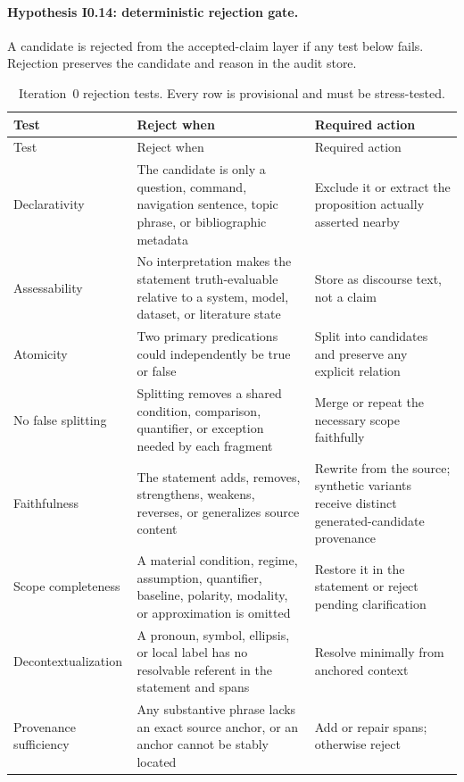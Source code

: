 \paragraph{Hypothesis I0.14: deterministic rejection gate.}
A candidate is rejected from the accepted-claim layer if any test below fails. Rejection preserves the candidate and reason in the audit store.

\small
\begin{longtable}{>{\raggedright\arraybackslash}p{}>{\raggedright\arraybackslash}p{}>{\raggedright\arraybackslash}p{}}
\caption{Iteration~0 rejection tests. Every row is provisional and must be stress-tested.}\label{tab:i0-rejection-tests}\\
\toprule
Test & Reject when & Required action \\
\midrule
\endfirsthead
\toprule
Test & Reject when & Required action \\
\midrule
\endhead
Declarativity & The candidate is only a question, command, navigation sentence, topic phrase, or bibliographic metadata & Exclude it or extract the proposition actually asserted nearby \\
Assessability & No interpretation makes the statement truth-evaluable relative to a system, model, dataset, or literature state & Store as discourse text, not a claim \\
Atomicity & Two primary predications could independently be true or false & Split into candidates and preserve any explicit relation \\
No false splitting & Splitting removes a shared condition, comparison, quantifier, or exception needed by each fragment & Merge or repeat the necessary scope faithfully \\
Faithfulness & The statement adds, removes, strengthens, weakens, reverses, or generalizes source content & Rewrite from the source; synthetic variants receive distinct generated-candidate provenance \\
Scope completeness & A material condition, regime, assumption, quantifier, baseline, polarity, modality, or approximation is omitted & Restore it in the statement or reject pending clarification \\
Decontextualization & A pronoun, symbol, ellipsis, or local label has no resolvable referent in the statement and spans & Resolve minimally from anchored context \\
Provenance sufficiency & Any substantive phrase lacks an exact source anchor, or an anchor cannot be stably located & Add or repair spans; otherwise reject \\

\end{longtable}
